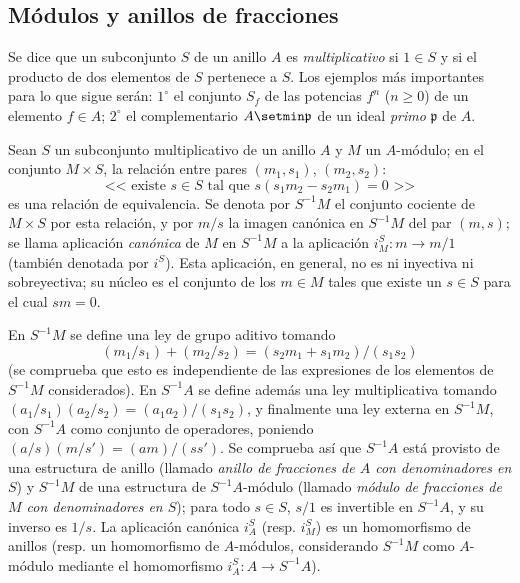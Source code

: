 \subsection{Módulos y anillos de fracciones}
\label{subsection:0.1.2-fr}

\begin{env}[1.2.1]
\label{0.1.2.1-fr}
Se dice que un subconjunto $S$ de un anillo $A$ es \emph{multiplicativo} si $1\in S$ y si el producto de dos elementos de $S$ pertenece a $S$.
Los ejemplos más importantes para lo que sigue serán: $1^\circ$ el conjunto $S_f$ de las potencias $f^n$ ($n\geq 0$) de un elemento $f\in A$; $2^\circ$ el complementario $A\setmin\mathfrak{p}$ de un ideal \emph{primo} $\mathfrak{p}$ de $A$.
\end{env}

\begin{env}[1.2.2]
\label{0.1.2.2-fr}
Sean $S$ un subconjunto multiplicativo de un anillo $A$ y $M$ un $A$-módulo; en el conjunto $M\times S$, la relación entre pares $(m_1,s_1)$, $(m_2,s_2)$:
\[
  \text{<<~existe $s\in S$ tal que $s(s_1m_2-s_2m_1)=0$~>>}
\]
es una relación de equivalencia.
Se denota por $S^{-1}M$ el conjunto cociente de $M\times S$ por esta relación, y por $m/s$ la imagen canónica en $S^{-1}M$ del par $(m,s)$; se llama aplicación \emph{canónica} de $M$ en $S^{-1}M$ a la aplicación $i_M^S:m\to m/1$ (también denotada por $i^S$).
Esta aplicación, en general, no es ni inyectiva ni sobreyectiva; su núcleo es el conjunto de los $m\in M$ tales que existe un $s\in S$ para el cual $sm=0$.

En $S^{-1}M$ se define una ley de grupo aditivo tomando
\[
  (m_1/s_1)+(m_2/s_2)=(s_2m_1+s_1m_2)/(s_1s_2)
\]
(se comprueba que esto es independiente de las expresiones de los elementos de $S^{-1}M$ considerados).
En $S^{-1}A$ se define además una ley multiplicativa tomando $(a_1/s_1)(a_2/s_2)=(a_1a_2)/(s_1s_2)$, y finalmente una ley externa en $S^{-1}M$, con $S^{-1}A$ como conjunto de operadores, poniendo $(a/s)(m/s')=(am)/(ss')$.
Se comprueba así que $S^{-1}A$ está provisto de una estructura de anillo (llamado \emph{anillo de fracciones de $A$ con denominadores en $S$}) y $S^{-1}M$ de una estructura de $S^{-1}A$-módulo (llamado \emph{módulo de fracciones de $M$ con denominadores en $S$}); para todo $s\in S$, $s/1$ es invertible en $S^{-1}A$, y su inverso es $1/s$.
La aplicación canónica $i_A^S$ (resp. $i_M^S$) es un homomorfismo de anillos (resp. un homomorfismo de $A$-módulos, considerando $S^{-1}M$ como $A$-módulo mediante el homomorfismo $i_A^S:A\to S^{-1}A$).
\end{env}

